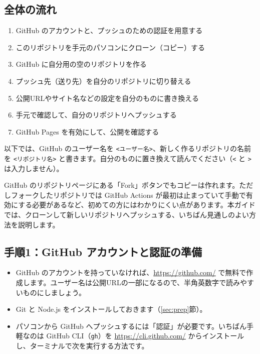 \documentclass[a4paper,11pt]{ltjsarticle}
\newcommand{\file}[1]{\texttt{#1}}
\begin{document}
\subsection{全体の流れ}

\begin{enumerate}
  \item GitHub のアカウントと、プッシュのための認証を用意する
  \item このリポジトリを手元のパソコンにクローン（コピー）する
  \item GitHub に自分用の空のリポジトリを作る
  \item プッシュ先（送り先）を自分のリポジトリに切り替える
  \item 公開URLやサイト名などの設定を自分のものに書き換える
  \item 手元で確認して、自分のリポジトリへプッシュする
  \item GitHub Pages を有効にして、公開を確認する
\end{enumerate}

以下では、GitHub のユーザー名を \file{<ユーザー名>}、新しく作るリポジトリの名前を \file{<リポジトリ名>} と書きます。自分のものに置き換えて読んでください（\file{<} と \file{>} は入力しません）。

\begin{hint}
GitHub のリポジトリページにある「Fork」ボタンでもコピーは作れます。ただしフォークしたリポジトリでは GitHub Actions が最初は止まっていて手動で有効にする必要があるなど、初めての方にはわかりにくい点があります。本ガイドでは、クローンして新しいリポジトリへプッシュする、いちばん見通しのよい方法を説明します。
\end{hint}

\subsection{手順1：GitHub アカウントと認証の準備}

\begin{itemize}
  \item GitHub のアカウントを持っていなければ、\url{https://github.com/} で無料で作成します。ユーザー名は公開URLの一部になるので、半角英数字で読みやすいものにしましょう。
  \item Git と Node.js をインストールしておきます（\ref{sec:prep}節）。
  \item パソコンから GitHub へプッシュするには「認証」が必要です。いちばん手軽なのは GitHub CLI（\file{gh}）を \url{https://cli.github.com/} からインストールし、ターミナルで次を実行する方法です。
\end{itemize}
\end{document}

